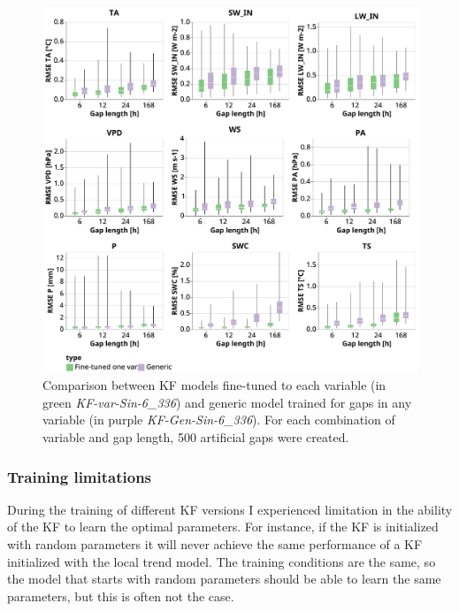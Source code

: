 \documentclass{article}
\newcommand{\imgwidth}{6in}
\begin{document}
\begin{figure}
\centerline{\includegraphics[width=\imgwidth]{generic}}
\caption{Comparison between KF models fine-tuned to each variable (in green \textit{KF-\textlangle var\textrangle-Sin-6\_336}) and generic model trained for gaps in any variable (in purple \textit{KF-Gen-Sin-6\_336}). For each combination of variable and gap length, 500 artificial gaps were created.}
\label{fig:generic}
\end{figure}

\subsubsection{Training limitations}

During the training of different KF versions I experienced limitation in the ability of the KF to learn the optimal parameters. For instance, if the KF is initialized with random parameters it will never achieve the same performance of a KF initialized with the local trend model. The training conditions are the same, so the model that starts with random parameters should be able to learn the same parameters, but this is often not the case.
\end{document}

